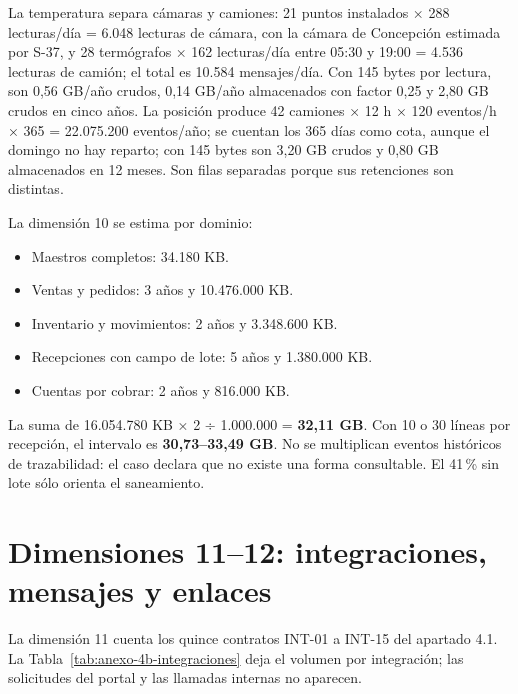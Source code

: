 La temperatura separa cámaras y camiones: 21 puntos instalados × 288 lecturas/día = 6.048 lecturas de cámara, con la cámara de Concepción estimada por S-37, y 28 termógrafos × 162 lecturas/día entre 05:30 y 19:00 = 4.536 lecturas de camión; el total es 10.584 mensajes/día. Con 145 bytes por lectura, son 0,56 GB/año crudos, 0,14 GB/año almacenados con factor 0,25 y 2,80 GB crudos en cinco años. La posición produce 42 camiones × 12 h × 120 eventos/h × 365 = 22.075.200 eventos/año; se cuentan los 365 días como cota, aunque el domingo no hay reparto; con 145 bytes son 3,20 GB crudos y 0,80 GB almacenados en 12 meses. Son filas separadas porque sus retenciones son distintas.

La dimensión 10 se estima por dominio:

\begin{itemize}
  \item Maestros completos: 34.180 KB.
  \item Ventas y pedidos: 3 años y 10.476.000 KB.
  \item Inventario y movimientos: 2 años y 3.348.600 KB.
  \item Recepciones con campo de lote: 5 años y 1.380.000 KB.
  \item Cuentas por cobrar: 2 años y 816.000 KB.
\end{itemize}

La suma de 16.054.780 KB × 2 ÷ 1.000.000 = \textbf{32,11 GB}. Con 10 o 30 líneas por recepción, el intervalo es \textbf{30,73–33,49 GB}. No se multiplican eventos históricos de trazabilidad: el caso declara que no existe una forma consultable. El 41\,\% sin lote sólo orienta el saneamiento.

\section{Dimensiones 11--12: integraciones, mensajes y enlaces}
\label{sec:anexo-4b-dimensiones-11-12}

La dimensión 11 cuenta los quince contratos INT-01 a INT-15 del apartado 4.1. La Tabla~\ref{tab:anexo-4b-integraciones} deja el volumen por integración; las solicitudes del portal y las llamadas internas no aparecen.

